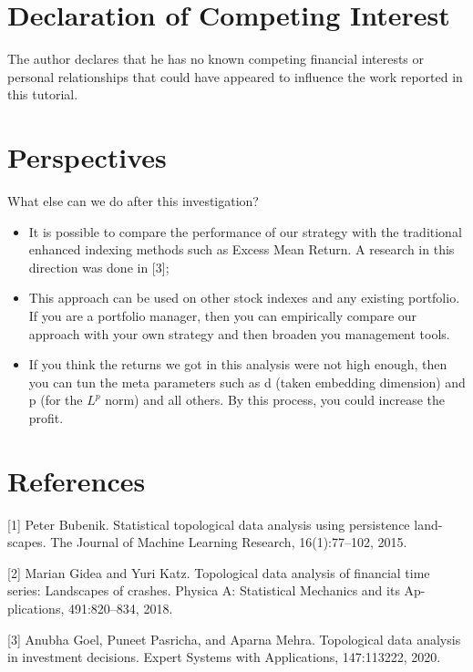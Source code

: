 \documentclass[11pt]{article}
\begin{document}
    \hypertarget{declaration-of-competing-interest}{%
\section{Declaration of Competing
Interest}\label{declaration-of-competing-interest}}

The author declares that he has no known competing financial interests
or personal relationships that could have appeared to influence the work
reported in this tutorial.

    \hypertarget{perspectives}{%
\section{Perspectives}\label{perspectives}}

What else can we do after this investigation?

\begin{itemize}
\item
  It is possible to compare the performance of our strategy with the
  traditional enhanced indexing methods such as Excess Mean Return. A
  research in this direction was done in {[}3{]};
\item
  This approach can be used on other stock indexes and any existing
  portfolio. If you are a portfolio manager, then you can empirically
  compare our approach with your own strategy and then broaden you
  management tools.
\item
  If you think the returns we got in this analysis were not high enough,
  then you can tun the meta parameters such as d (taken embedding
  dimension) and p (for the \(L^p\) norm) and all others. By this
  process, you could increase the profit.
\end{itemize}

    \hypertarget{references}{%
\section{References}\label{references}}

    {[}1{]} Peter Bubenik. Statistical topological data analysis using
persistence land- scapes. The Journal of Machine Learning Research,
16(1):77--102, 2015.

{[}2{]} Marian Gidea and Yuri Katz. Topological data analysis of
financial time series: Landscapes of crashes. Physica A: Statistical
Mechanics and its Ap- plications, 491:820--834, 2018.

{[}3{]} Anubha Goel, Puneet Pasricha, and Aparna Mehra. Topological data
analysis in investment decisions. Expert Systems with Applications,
147:113222, 2020.


    
    
    
\end{document}
